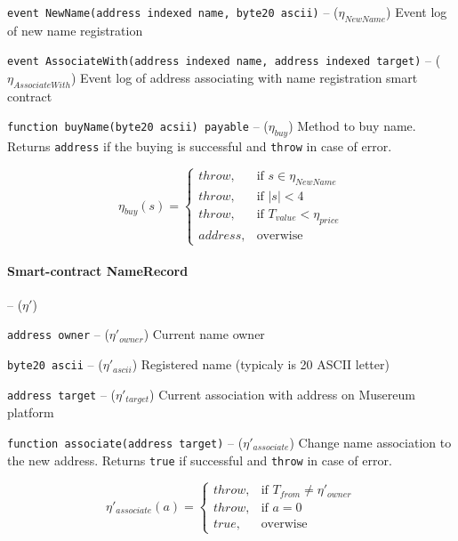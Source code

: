 \documentclass[12pt]{report}
\newcommand{\hlc}[1]{\colorbox{yellow!25}{#1}}
\def\code#1{\colorbox{light-gray}{\texttt{#1}}}
\begin{document}
\code{event NewName(address indexed name, byte20 ascii)} – ($\eta_{NewName}$)\hfill\null\linebreak
\hlc{Event log} of new name registration

\code{event AssociateWith(address indexed name, address indexed target)} – ($\eta_{AssociateWith}$)\hfill\null\linebreak
Event log of address associating with name registration smart contract

\code{function buyName(byte20 acsii) payable} – ($\eta_{buy}$)\hfill\null\linebreak
Method to buy name. Returns \code{address} if the buying is successful and \code{throw} in case of error.

\begin{equation}
\eta_{buy}(s) = \begin{cases}
	throw, & \text{if } s \in \eta_{NewName} \\ 
	throw, & \text{if } |s| < 4 \\
	throw, & \text{if } T_{value} < \eta_{price} \\
	address, & \text{overwise}
\end{cases}
\end{equation}

\paragraph{Smart-contract NameRecord}– ($\eta'$)

\code{address owner} – ($\eta'_{owner}$)\hfill\null\linebreak
Current name owner

\code{byte20 ascii} – ($\eta'_{ascii}$)\hfill\null\linebreak
Registered name (typicaly is 20 ASCII letter)

\code{address target} – ($\eta'_{target}$)\hfill\null\linebreak
Current association with address on Musereum platform

\code{function associate(address target)} – ($\eta'_{associate}$)\hfill\null\linebreak
Change name association to the new address. Returns \code{true} if successful and \code{throw} in case of error.
 
\begin{equation}
\eta'_{associate}(a) = \begin{cases}
	throw, & \text{if } T_{from} \neq \eta'_{owner} \\
	throw, & \text{if } a = 0 \\
	true, & \text{overwise}
\end{cases}
\end{equation}
\end{document}
